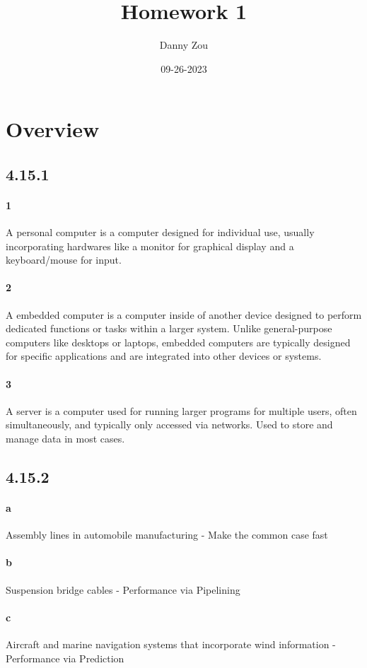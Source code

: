 \documentclass{article}
\title{Homework 1}
\date{09-26-2023}
\author{Danny Zou}
\begin{document}
    \maketitle

    \section{Overview}
    
    \subsection*{4.15.1}
    \paragraph*{1} A personal computer is a computer designed for individual use, usually incorporating hardwares like a monitor for graphical display and a keyboard/mouse for input.
    \paragraph*{2} A embedded computer is a computer inside of another device designed to perform dedicated functions or tasks within a larger system. Unlike general-purpose computers like desktops or laptops, embedded computers are typically designed for specific applications and are integrated into other devices or systems.
    \paragraph*{3} A server is a computer used for running larger programs for multiple users, often simultaneously, and typically only accessed via networks. Used to store and manage data in most cases.
    
    \subsection*{4.15.2}
    \paragraph*{a} Assembly lines in automobile manufacturing - Make the common case fast
    \paragraph*{b} Suspension bridge cables - Performance via Pipelining
    \paragraph*{c} Aircraft and marine navigation systems that incorporate wind information - Performance via Prediction
\end{document}

